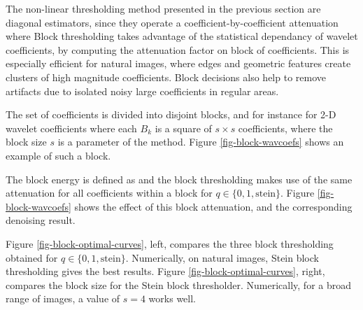 The non-linear thresholding method presented in the previous section are diagonal estimators, since they operate a coefficient-by-coefficient attenuation
where 
Block thresholding takes advantage of the statistical dependancy of wavelet coefficients, by computing the attenuation factor on block of coefficients. This is especially efficient for natural images, where edges and geometric features create clusters of high magnitude coefficients. Block decisions also help to remove artifacts due to isolated noisy large coefficients in regular areas.

The set of coefficients is divided into disjoint blocks, and for instance for 2-D wavelet coefficients
where each $B_k$ is a square of $s \times s$ coefficients, where the block size $s$ is a parameter of the method. 
Figure \ref{fig-block-wavcoefs} shows an example of such a block.

The block energy is defined as
and the block thresholding 
makes use of the same attenuation for all coefficients within a block
for $q \in \{0,1,\text{stein}\}$.
Figure \ref{fig-block-wavcoefs} shows the effect of this block attenuation, and the corresponding denoising result.


Figure \ref{fig-block-optimal-curves}, left, compares the three block thresholding obtained for $q \in \{0,1,\text{stein}\}$. Numerically, on natural images, Stein block thresholding gives the best results.
Figure \ref{fig-block-optimal-curves}, right, compares the block size for the Stein block thresholder. Numerically, for a broad range of images, a value of $s=4$ works well.


